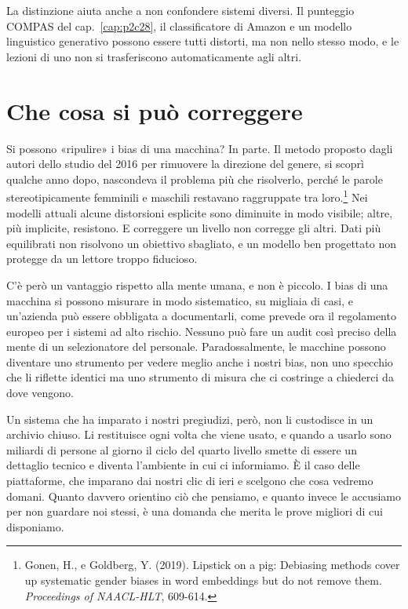 La distinzione aiuta anche a non confondere sistemi diversi. Il punteggio COMPAS del cap.~\ref{cap:p2c28}, il classificatore di Amazon e un modello linguistico generativo possono essere tutti distorti, ma non nello stesso modo, e le lezioni di uno non si trasferiscono automaticamente agli altri.


\section{Che cosa si può correggere}

Si possono «ripulire» i bias di una macchina? In parte. Il metodo proposto dagli autori dello studio del 2016 per rimuovere la direzione del genere, si scoprì qualche anno dopo, nascondeva il problema più che risolverlo, perché le parole stereotipicamente femminili e maschili restavano raggruppate tra loro.\footnote{Gonen, H., e Goldberg, Y. (2019). Lipstick on a pig: Debiasing methods cover up systematic gender biases in word embeddings but do not remove them. \textit{Proceedings of NAACL-HLT}, 609-614.} Nei modelli attuali alcune distorsioni esplicite sono diminuite in modo visibile; altre, più implicite, resistono. E correggere un livello non corregge gli altri. Dati più equilibrati non risolvono un obiettivo sbagliato, e un modello ben progettato non protegge da un lettore troppo fiducioso.

C'è però un vantaggio rispetto alla mente umana, e non è piccolo. I bias di una macchina si possono misurare in modo sistematico, su migliaia di casi, e un'azienda può essere obbligata a documentarli, come prevede ora il regolamento europeo per i sistemi ad alto rischio. Nessuno può fare un audit così preciso della mente di un selezionatore del personale. Paradossalmente, le macchine possono diventare uno strumento per vedere meglio anche i nostri bias, non uno specchio che li riflette identici ma uno strumento di misura che ci costringe a chiederci da dove vengono.

Un sistema che ha imparato i nostri pregiudizi, però, non li custodisce in un archivio chiuso. Li restituisce ogni volta che viene usato, e quando a usarlo sono miliardi di persone al giorno il ciclo del quarto livello smette di essere un dettaglio tecnico e diventa l'ambiente in cui ci informiamo. È il caso delle piattaforme, che imparano dai nostri clic di ieri e scelgono che cosa vedremo domani. Quanto davvero orientino ciò che pensiamo, e quanto invece le accusiamo per non guardare noi stessi, è una domanda che merita le prove migliori di cui disponiamo.
